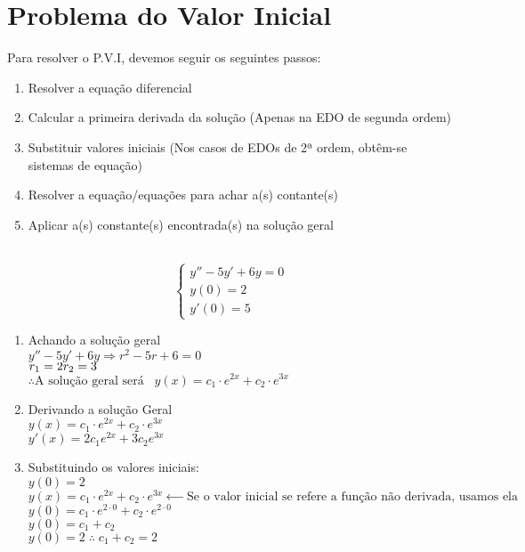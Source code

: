 \documentclass{article}
\begin{document}
{\begin{enumerate}
    
    
\end{enumerate}

\newpage
\section{Problema do Valor Inicial}
Para resolver o P.V.I, devemos seguir os seguintes passos:\\
\begin{enumerate}
    \item Resolver a equação diferencial
    \item Calcular a primeira derivada da solução (Apenas na EDO de segunda ordem)
    \item Substituir valores iniciais (Nos casos de EDOs de 2ª ordem, obtêm-se sistemas de equação)
    \item Resolver a equação/equações para achar a(s) contante(s)
    \item Aplicar a(s) constante(s) encontrada(s) na solução geral
\end{enumerate}

\\
\[
\left\{
\begin{aligned}
y''-5y'+6y=0 \\
y(0)=2\\
y'(0)=5
\end{aligned}
\right.
\]
\begin{enumerate}
    \item Achando a solução geral\\
    $y''-5y'+6y \Rightarrow{} r^2-5r+6=0$\\
    $r_1=2\\
     r_2=3$\\
     $\therefore \text{A solução geral será}\;\;\;y(x)=c_1\cdot e^{2x}+c_2\cdot e^{3x}$
     \item Derivando a solução Geral\\
     $y(x)=c_1\cdot e^{2x}+c_2\cdot e^{3x}$\\
     $y'(x)=2c_1e^{2x}+3c_2e^{3x}$
     \item Substituindo os valores iniciais:\\
     $y(0)=2$\\
     $y(x)=c_1\cdot e^{2x}+c_2\cdot e^{3x} \xleftarrow{\;\;\;\;\;\;\;} \text{Se o valor inicial se refere a função não derivada, usamos ela}$\\
     $y(0)=c_1\cdot e^{2\cdot0}+c_2\cdot e^{2\cdot0}$\\
     $y(0)=c_1+c_2$\\
     $y(0)=2 \;\therefore\; \boxed{c_1+c_2=2}$\\


\end{enumerate}}
\end{document}
